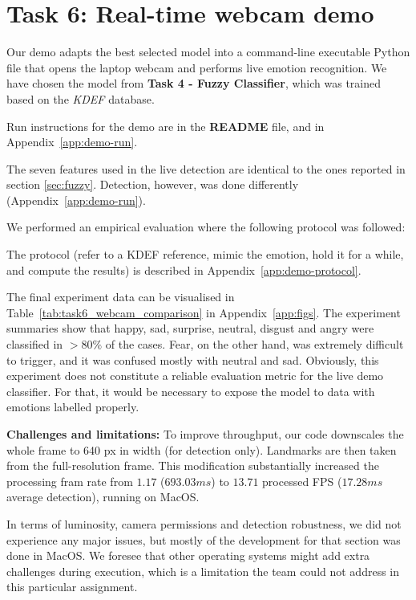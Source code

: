 \section{Task 6: Real-time webcam demo}
\label{sec:task6}
Our demo adapts the best selected model into a command-line executable Python file that opens the laptop webcam and performs live emotion recognition. We have chosen the model from \textbf{Task 4 - Fuzzy Classifier}, which was trained based on the \textit{KDEF} database.

Run instructions for the demo are in the \textbf{README} file, and in Appendix~\ref{app:demo-run}. 

The seven features used in the live detection are identical to the ones reported in section \ref{sec:fuzzy}. Detection, however, was done differently (Appendix~\ref{app:demo-run}).

We performed an empirical evaluation where the following protocol was followed:

The protocol (refer to a KDEF reference, mimic the emotion, hold it for a while, and compute the results) is described in Appendix~\ref{app:demo-protocol}.

The final experiment data can be visualised in Table~\ref{tab:task6_webcam_comparison} in Appendix~\ref{app:figs}. The experiment summaries show that happy, sad, surprise, neutral, disgust and angry were classified in $>80\%$ of the cases. Fear, on the other hand, was extremely difficult to trigger, and it was confused mostly with neutral and sad. Obviously, this experiment does not constitute a reliable evaluation metric for the live demo classifier. For that, it would be necessary to expose the model to data with emotions labelled properly.

\textbf{Challenges and limitations:}
To improve throughput, our code downscales the whole frame to 640 px in width (for detection only). Landmarks are then taken from the full-resolution frame. This modification substantially increased the processing fram rate from $1.17$ ($693.03 ms$) to $13.71$ processed FPS ($17.28 ms$ average detection), running on MacOS.

In terms of luminosity, camera permissions and detection robustness, we did not experience any major issues, but mostly of the development for that section was done in MacOS. We foresee that other operating systems might add extra challenges during execution, which is a limitation the team could not address in this particular assignment.